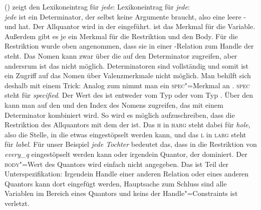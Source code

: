 () zeigt den Lexikoneintrag für \emph{jede}:
\eas
Lexikoneintrag für \emph{jede}:\\
\zs
\emph{jede} ist ein Determinator, der selbst keine Argumente braucht, also eine leere \spr- und
\compsl hat. Der Allquantor wird in der \relsl eingeführt. \argzero ist das Merkmal für die
Variable. Außerdem gibt es je ein Merkmal für die Restriktion und den Body. Für die Restriktion
wurde oben angenommen, dass sie in einer \qeq\vspace{-2pt}\hspace{-.5ex}\hyp Relation zum Handle der \nbar steht. Das Nomen kann
zwar über die \sprl auf den Determinator zugreifen, aber andersrum ist das nicht
möglich. Determinatoren sind vollständig und somit ist ein Zugriff auf das Nomen über Valenzmerkmale
nicht möglich. Man behilft sich deshalb mit einem Trick: Analog zum \modm nimmt man ein
\textsc{spec}"=Merkmal an \citep[--51]{ps2}. \textsc{spec} steht für \emph{specified}. Der Wert des \specms ist
entweder vom Typ  oder vom Typ . Über den \specw kann man auf den \ltopw und
den Index des Nomens zugreifen, das mit einem Determinator kombiniert wird. So wird es möglich
aufzuschreiben, dass die Restriktion des Allquantors \qeq\vspace{-2pt} mit dem \ltopw der \nbar
ist. Das \textsc{h} in \textsc{harg} steht dabei für \emph{hole}, also die Stelle, in die etwas
eingestöpselt werden kann, und das \textsc{l} in \textsc{larg} steht für \emph{label}. Für unser
Beispiel \emph{jede Tochter} bedeutet das, dass  in die Restriktion von
\emph{every\_q} eingestöpselt werden kann oder irgendein Quantor, der 
dominiert. Der \textsc{body}"=Wert des Quantors wird einfach nicht angegeben. Das ist Teil der
Unterspezifikation: Irgendein Handle einer anderen Relation oder eines anderen Quantors kann dort
eingefügt werden, Hauptsache zum Schluss sind alle Variablen im Bereich eines Quantors und keins der
Handle"=Constraints ist verletzt.

